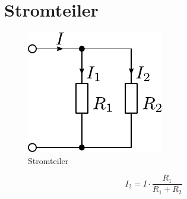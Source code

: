 



\section{Stromteiler}
\begin{figure}[h!]
	\centering
	\includegraphics[scale=\schscale]{iteil.pdf}
	\caption{Stromteiler}
	\label{sch:iteil}
\end{figure}
\[ I_2 = I \cdot \frac{R_1}{R_1 + R_2} \]